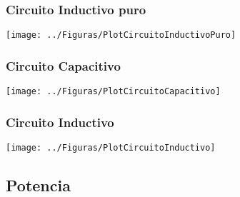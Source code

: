 \documentclass[serif, xcolor=dvipsnames]{beamer}
\begin{document}
\begin{frame}[plain]
  \frametitle{Circuito Inductivo puro}

  \begin{center}
    \texttt{[image: ../Figuras/PlotCircuitoInductivoPuro]}
    \par\end{center}


\end{frame}
\begin{frame}[plain]
  \frametitle{Circuito Capacitivo}

  \begin{center}
    \texttt{[image: ../Figuras/PlotCircuitoCapacitivo]}
    \par\end{center}


\end{frame}
\begin{frame}[plain]
  \frametitle{Circuito Inductivo}

  \begin{center}
    \texttt{[image: ../Figuras/PlotCircuitoInductivo]}
    \par\end{center}


\end{frame}
\subsection{Potencia}
\end{document}
